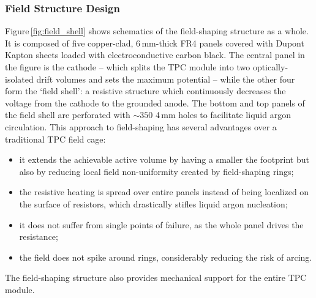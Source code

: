 \subsubsection{Field Structure Design}
\label{sec:lartpc-fs-design}
Figure\,\ref{fig:field_shell} shows schematics of the field-shaping structure as a whole. It is composed of five copper-clad, 6\,mm-thick FR4 panels covered with Dupont Kapton sheets loaded with electroconductive carbon black. The central panel in the figure is the cathode -- which splits the TPC module into two optically-isolated drift volumes and sets the maximum potential -- while the other four form the `field shell': a resistive structure which continuously decreases the voltage from the cathode to the grounded anode. The bottom and top panels of the field shell are perforated with $\sim350$ 4\,mm holes to facilitate liquid argon circulation. This approach to field-shaping has several advantages over a traditional TPC field cage:
\begin{itemize}
  \item it extends the achievable active volume by having a smaller the footprint but also by reducing local field non-uniformity created by field-shaping rings;
  \item the resistive heating is spread over entire panels instead of being localized on the surface of resistors, which drastically stifles liquid argon nucleation;
  \item it does not suffer from single points of failure, as the whole panel drives the resistance;
  \item the field does not spike around rings, considerably reducing the risk of arcing.
\end{itemize}
The field-shaping structure also provides mechanical support for the entire TPC module.

